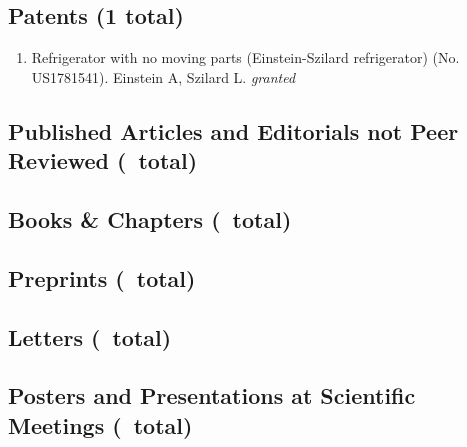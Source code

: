 \documentclass[martgin, line]{article}
\begin{document}
\subsection*{Patents (1 total)}
\begin{enumerate}
    \item
  Refrigerator with no moving parts (Einstein-Szilard refrigerator)
   (No. US1781541).
    Einstein A,
    Szilard L.
  \textit{granted}
  \end{enumerate}


\subsection*{Published Articles and Editorials not Peer Reviewed (\nnopeer\ total)}

\begin{enumerate}
  
\end{enumerate}


\subsection*{Books \& Chapters (\nchapters\ total)}

\begin{enumerate}
  
\end{enumerate}


\subsection*{Preprints (\npreprint\ total)}

\begin{enumerate}
  
\end{enumerate}


\subsection*{Letters (\nletters\ total)}

\begin{enumerate}
  
\end{enumerate}


\subsection*{Posters and Presentations at Scientific Meetings (\npres\ total)}

\begin{enumerate}
  
\end{enumerate}
\end{document}
